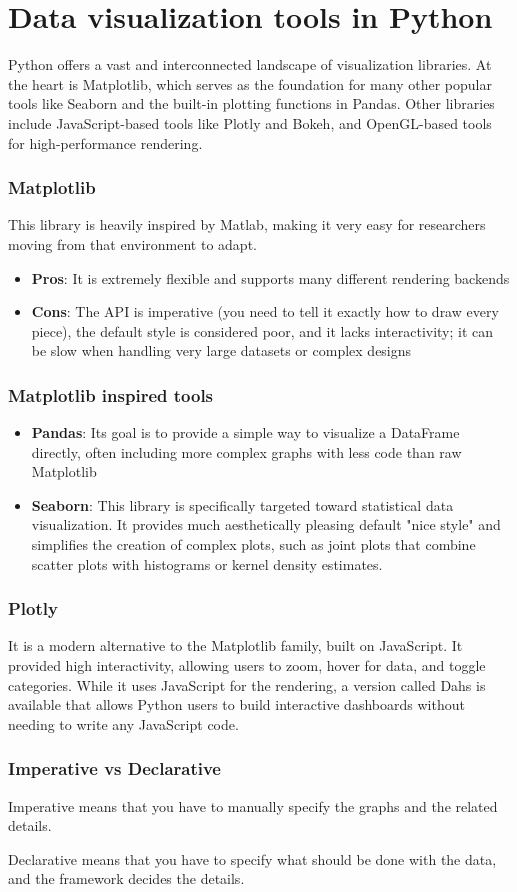 \section{Data visualization tools in Python}
Python offers a vast and interconnected landscape of visualization libraries. At the heart is Matplotlib, which serves as the foundation for many other popular tools like Seaborn and the built-in plotting functions in Pandas. Other libraries include JavaScript-based tools like Plotly and Bokeh, and OpenGL-based tools for high-performance rendering. 

\subsubsection{Matplotlib}
This library is heavily inspired by Matlab, making it very easy for researchers moving from that environment to adapt. 

\begin{itemize}[noitemsep]
    \item \textbf{Pros}: It is extremely flexible and supports many different rendering backends
    \item \textbf{Cons}: The API is imperative (you need to tell it exactly how to draw every piece), the default style is considered poor, and it lacks interactivity; it can be slow when handling very large datasets or complex designs
\end{itemize}

\subsubsection{Matplotlib inspired tools}
\begin{itemize}[noitemsep]
    \item \textbf{Pandas}: Its goal is to provide a simple way to visualize a DataFrame directly, often including more complex graphs with less code than raw Matplotlib
    \item \textbf{Seaborn}: This library is specifically targeted toward statistical data visualization. It provides much aesthetically pleasing default "nice style" and simplifies the creation of complex plots, such as joint plots that combine scatter plots with histograms or kernel density estimates.
\end{itemize}

\subsubsection{Plotly}
It is a modern alternative to the Matplotlib family, built on JavaScript. It provided high interactivity, allowing users to zoom, hover for data, and toggle categories. While it uses JavaScript for the rendering, a version called Dahs is available that allows Python users to build interactive dashboards without needing to write any JavaScript code.

\subsubsection{Imperative vs Declarative}
Imperative means that you have to manually specify the graphs and the related details.\par
Declarative means that you have to specify what should be done with the data, and the framework decides the details.